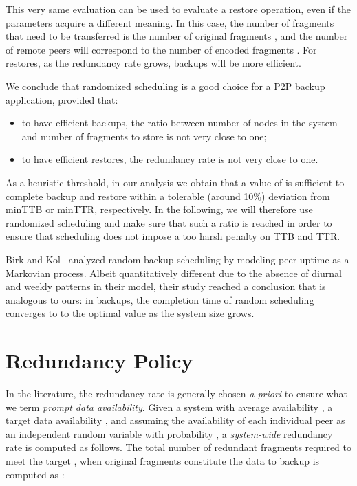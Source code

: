 \documentclass[conference,10pt]{IEEEtran}
\begin{document}
This very same evaluation can be used to evaluate a restore operation,
even if the parameters acquire a different meaning. In this case, the
number  of fragments that need to be transferred is the number of
original fragments , and the number of remote peers  will
correspond to the number of encoded fragments . For restores, as
the redundancy rate  grows, backups will be
more efficient.

We conclude that randomized scheduling is a good choice for a P2P
backup application, provided that:
\begin{itemize}
\item to have efficient backups, the ratio between number of nodes
      in the system and number of fragments to store is not very close
      to one;
\item to have efficient restores, the redundancy rate is not very close to one.
\end{itemize}

As a heuristic threshold, in our analysis we obtain that a value of
 is sufficient to complete backup and restore within a
tolerable (around 10\%) deviation from minTTB or minTTR,
respectively. In the following, we will therefore use randomized
scheduling and make sure that such a ratio is reached in order to
ensure that scheduling does not impose a too harsh penalty on TTB and
TTR.

Birk and Kol~\cite{1339108} analyzed random backup scheduling by
modeling peer uptime as a Markovian process. Albeit quantitatively
different due to the absence of diurnal and weekly patterns in their
model, their study reached a conclusion that is analogous to ours: in
backups, the completion time of random scheduling converges to to the
optimal value as the system size grows.

\section{Redundancy Policy}
\label{sec:red}

In the literature, the redundancy rate is generally chosen \emph{a priori} to ensure what we term \emph{prompt data availability}. Given a system with average availability , a target data availability , and assuming the availability of each individual peer as an independent random variable with probability , a \emph{system-wide} redundancy rate is computed as follows. The total number  of redundant fragments required to meet the target , when  original fragments constitute the data to backup is computed as \cite{bhagwan2003availability}:
\end{document}

